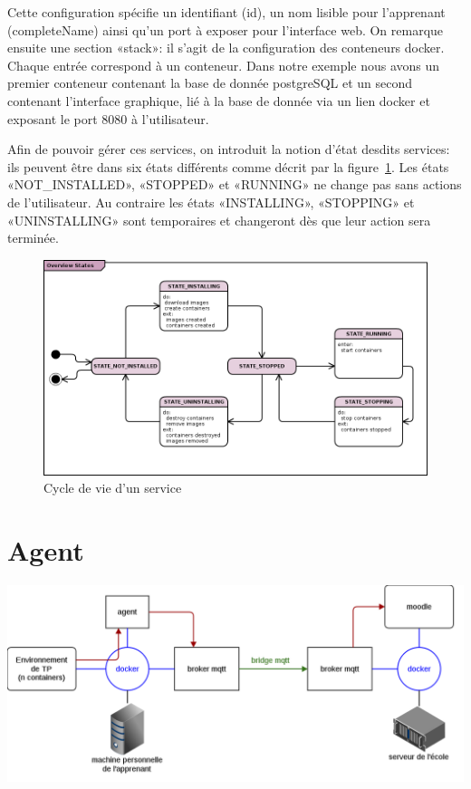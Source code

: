 \documentclass[a4paper,11pt]{report}
\begin{document}
Cette configuration spécifie un identifiant (id), un nom lisible pour l'apprenant (completeName) ainsi qu'un port à exposer pour l'interface web. On remarque ensuite une section «stack»: il s'agit de la configuration des conteneurs docker. Chaque entrée correspond à un conteneur. Dans notre exemple nous avons un premier conteneur contenant la base de donnée postgreSQL et un second contenant l'interface graphique, lié à la base de donnée via un lien docker et exposant le port 8080 à l'utilisateur.

Afin de pouvoir gérer ces services, on introduit la notion d'état desdits services: ils peuvent être dans six états différents comme décrit par la figure~\ref{overview-states}. Les états «NOT\_INSTALLED», «STOPPED» et «RUNNING» ne change pas sans actions de l'utilisateur. Au contraire les états «INSTALLING», «STOPPING» et «UNINSTALLING» sont temporaires et changeront dès que leur action sera terminée.


\begin{figure}[h]
   \caption{\label{overview-states} Cycle de vie d'un service}
   \centering
   \includegraphics[width=\textwidth, keepaspectratio=true]{overview-states.png}
\end{figure}

\section{Agent}

\includegraphics[scale=0.45]{docker}
\end{document}

